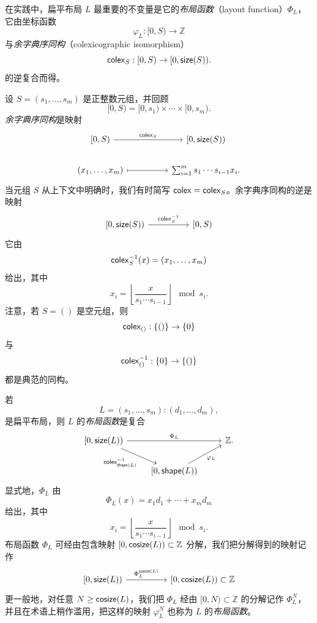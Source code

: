 在实践中，扁平布局 $L$ 最重要的不变量是它的{\it 布局函数}（layout function）$\Phi_L$，它由坐标函数
\[
\varphi_L:[0,S) \to \mathbb{Z}
\]
与{\it 余字典序同构}（colexicographic isomorphism）
\[
\mathsf{colex}_S:[0,S) \to [0,\mathsf{size}(S)).
\]
的逆复合而得。

\begin{definition}\label{definitionofcolex}
    设 $S = (s_1,\dots,s_m)$ 是正整数元组，并回顾
    \[
    [0,S) = [0,s_1) \times \cdots \times [0,s_m).
    \]
    {\it 余字典序同构}是映射
    \[ \begin{tikzcd}
    {[}0,S{)} \ar[rr,"\colex_{S}"] & & \text{[}0,\size(S)\text{)}\\
    (x_1,\dots,x_m) \ar[rr,mapsto] & & \sum_{i=1}^m s_1 \cdots s_{i-1} x_i.
    \end{tikzcd} \]
    当元组 $S$ 从上下文中明确时，我们有时简写 $\mathsf{colex} = \mathsf{colex}_{S}$。余字典序同构的逆是映射
    \[ \begin{tikzcd}
    \text{[}0,\size(S)\text{)} \ar[rr,"\colex_{S}^{-1}"] & & {[}0,S{)}
    \end{tikzcd} \]
    它由
    \[
    \mathsf{colex}_S^{-1}(x) = (x_1,\dots,x_m)
    \]
    给出，其中
    \[
    x_i = \left\lfloor \dfrac{x}{s_1 \cdots s_{i-1}} \right\rfloor \mod s_i.
    \]
    注意，若 $S = ()$ 是空元组，则
    \[
    \mathsf{colex}_{()}:\{()\} \to \{0\}
    \]
    与
    \[
    \mathsf{colex}_{()}^{-1}:\{0\} \to \{()\}
    \]
    都是典范的同构。
\end{definition}



\begin{construction}[布局函数]\label{constructionoflayoutfunctions}
    若
    \[L = (s_1,\dots,s_m):(d_1,\dots,d_m),\]
    是扁平布局，则 $L$ 的{\it 布局函数}是复合
    \[ \begin{tikzcd}
    {[}0,\size(L){)} \ar[rr,"\Phi_L"] \ar[dr,swap,"\colex^{-1}_{\shape(L)}"] & & \mathbb{Z}. \\
     & {[}0,\shape(L){)} \ar[ur,swap,"\varphi_L"] &
    \end{tikzcd} \]
    显式地，$\Phi_L$ 由
    \[
    \Phi_L(x) = x_1 d_1 + \cdots + x_m d_m
    \]
    给出，其中
    \[
    x_i = \left \lfloor \dfrac{x}{s_1 \cdots s_{i-1}} \right \rfloor \mod s_i.
    \]
    布局函数 $\Phi_L$ 可经由包含映射 $[0,\mathsf{cosize}(L)) \subset \mathbb{Z}$ 分解，我们把分解得到的映射记作
    \[\begin{tikzcd} {[}0,\size(L){)} \ar[rr,"\Phi_L^{\cosize(L)}"] & & {[}0,\cosize(L){)}\subset \mathbb{Z}
    \end{tikzcd} \]
    更一般地，对任意 $N \geq \mathsf{cosize}(L)$，我们把 $\Phi_L$ 经由 $[0,N) \subset \mathbb{Z}$ 的分解记作 $\Phi_L^N$，并且在术语上稍作滥用，把这样的映射 $\varphi_L^N$ 也称为 $L$ 的{\it 布局函数}。
\end{construction}

